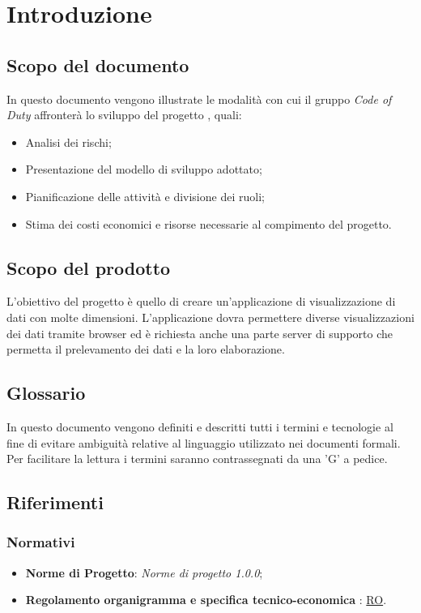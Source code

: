 \section{Introduzione}
\subsection{Scopo del documento}
	In questo documento vengono illustrate le modalità con cui il gruppo \textit{Code of Duty} affronterà lo sviluppo del progetto \hd, quali:
	\begin{itemize}
    		\item Analisi dei rischi;
    		\item Presentazione del modello di sviluppo adottato;
    		\item Pianificazione delle attività e divisione dei ruoli;
    		\item Stima dei costi economici e risorse necessarie al compimento del progetto.
	\end{itemize}
\subsection{Scopo del prodotto}
	L'obiettivo del progetto è quello di creare un'applicazione di visualizzazione di dati con molte dimensioni. L'applicazione dovra permettere diverse visualizzazioni dei dati tramite browser ed è richiesta anche una parte server di supporto che permetta il prelevamento dei dati e la loro elaborazione.
\subsection{Glossario}
	In questo documento vengono definiti e descritti tutti i termini e tecnologie al fine di evitare ambiguità relative al linguaggio utilizzato nei documenti formali. Per facilitare la lettura i termini saranno contrassegnati da una 'G' a pedice.  
\subsection{Riferimenti}
	\subsubsection{Normativi}
		\begin{itemize}
			\item \textbf{Norme di Progetto}: \textit{Norme di progetto 1.0.0};
			\item \textbf{Regolamento organigramma e specifica tecnico-economica} : \href{https://www.math.unipd.it/~tullio/IS-1/2020/Progetto/RO.html}{RO}.
		\end{itemize}
